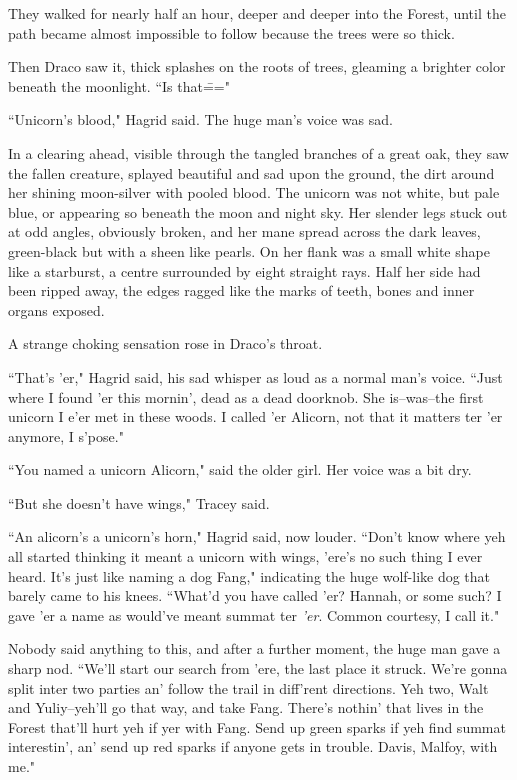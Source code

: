 They walked for nearly half an hour, deeper and deeper into the Forest, until the path became almost impossible to follow because the trees were so thick.

Then Draco saw it, thick splashes on the roots of trees, gleaming a brighter color beneath the moonlight. ``Is that\==="

``Unicorn's blood," Hagrid said. The huge man's voice was sad.

In a clearing ahead, visible through the tangled branches of a great oak, they saw the fallen creature, splayed beautiful and sad upon the ground, the dirt around her shining moon-silver with pooled blood. The unicorn was not white, but pale blue, or appearing so beneath the moon and night sky. Her slender legs stuck out at odd angles, obviously broken, and her mane spread across the dark leaves, green-black but with a sheen like pearls. On her flank was a small white shape like a starburst, a centre surrounded by eight straight rays. Half her side had been ripped away, the edges ragged like the marks of teeth, bones and inner organs exposed.

A strange choking sensation rose in Draco's throat.

``That's 'er," Hagrid said, his sad whisper as loud as a normal man's voice. ``Just where I found 'er this mornin', dead as a dead doorknob. She is\---was\---the first unicorn I e'er met in these woods. I called 'er Alicorn, not that it matters ter 'er anymore, I s'pose."

``You named a unicorn Alicorn," said the older girl. Her voice was a bit dry.

``But she doesn't have wings," Tracey said.

``An alicorn's a unicorn's horn," Hagrid said, now louder. ``Don't know where yeh all started thinking it meant a unicorn with wings, 'ere's no such thing I ever heard. It's just like naming a dog Fang," indicating the huge wolf-like dog that barely came to his knees. ``What'd you have called 'er? Hannah, or some such? I gave 'er a name as would've meant summat ter \emph{'er}. Common courtesy, I call it."

Nobody said anything to this, and after a further moment, the huge man gave a sharp nod. ``We'll start our search from 'ere, the last place it struck. We're gonna split inter two parties an' follow the trail in diff'rent directions. Yeh two, Walt and Yuliy\---yeh'll go that way, and take Fang. There's nothin' that lives in the Forest that'll hurt yeh if yer with Fang. Send up green sparks if yeh find summat interestin', an' send up red sparks if anyone gets in trouble. Davis, Malfoy, with me."

